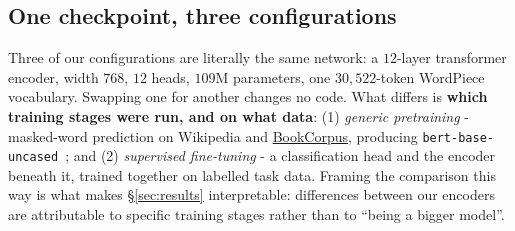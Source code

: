 \documentclass[10pt,a4paper]{article}
\begin{document}
\subsection{One checkpoint, three configurations}
\label{sec:onearch}

Three of our configurations are literally the same network: a $12$-layer transformer
encoder, width $768$, $12$ heads, $109$M parameters, one $30{,}522$-token WordPiece
vocabulary.
Swapping one for another changes no code. What differs is \textbf{which training stages were run, and on what data}: (1)
\emph{generic pretraining} - masked-word prediction on Wikipedia and
\href{https://en.wikipedia.org/wiki/BookCorpus}{BookCorpus}, producing
\texttt{bert-base-uncased}~\cite{devlin2019}; and (2) \emph{supervised fine-tuning} - a
classification head and the encoder beneath it, trained together on labelled task data.
Framing the comparison this way is what makes \S\ref{sec:results} interpretable:
differences between our encoders are attributable to specific training stages rather than
to ``being a bigger model''.
\end{document}
